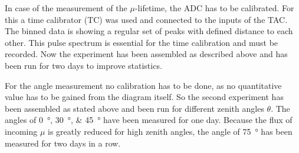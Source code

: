 	In case of the measurement of the $\mu$-lifetime, the ADC has to be calibrated.
	For this a time calibrator (TC) was used and connected to the inputs of the TAC.
	The binned data is showing a regular set of peaks with defined distance to each other.
	This pulse spectrum is essential for the time calibration and must be recorded.
	Now the experiment has been assembled as described above and has been run for two days to improve statistics.
	
	For the angle measurement no calibration has to be done, as no quantitative value has to be gained from the diagram itself.
	So the second experiment has been assembled as stated above and been run for different zenith angles $\theta$.
	The angles of \SIlist{0;30;45}{\degree} have been measured for one day.
	Because the flux of incoming $\mu$ is greatly reduced for high zenith angles, the angle of \SI{75}{\degree} has been measured for two days in a row.
	

%
